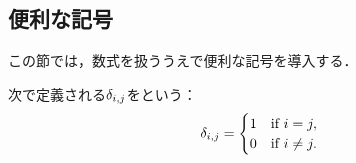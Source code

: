 \documentclass[../sotsu.tex]{subfiles}
\begin{document}
\subsection{便利な記号}

この節では，数式を扱ううえで便利な記号を導入する．

\begin{definition}[クロネッカーのデルタ]
    \label{dfn:Kronecker-delta}
    次で定義される$\delta_{i, j}$をという：
    \begin{equation}
        \delta_{i, j} = 
            \begin{cases}
                1  &  \text{if } i  =   j ,  \\
                0  &  \text{if } i \neq j .
            \end{cases}
    \end{equation}
\end{definition}
\end{document}
